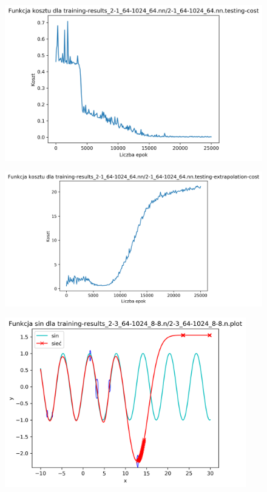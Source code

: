 \documentclass{classrep}
\begin{document}
{{\begin{figure}[!htbp]
            \end{figure}
            \begin{figure}[!htbp]
                \centering
                \includegraphics[width=120mm]{wykresy/2-1_64-1024_64_nn_testing-cost.png}
            \end{figure}
            \begin{figure}[!htbp]
                \centering
                \includegraphics[width=140mm]{wykresy/2-1_64-1024_64_nn_testing-extrapolation-cost.png}
            \end{figure}
            \FloatBarrier
            \begin{figure}[!htbp]
                \centering
                \includegraphics[width=105mm]{wykresy/2-3_64-1024_8-8_n_plot.png}

\end{figure}}}
\end{document}
